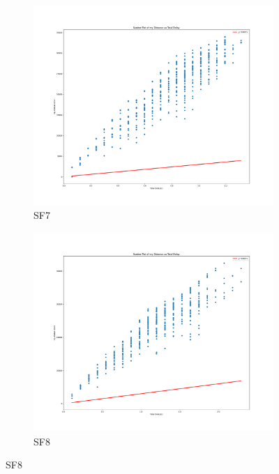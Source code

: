 \newpage

\begin{figure}[htp!]
    \centering
    \begin{subfigure}{0.45\linewidth}
        \includegraphics[width=\linewidth]{images/BlindZone1.png}
        \caption{SF7}
    \end{subfigure}
    \hfill
    \begin{subfigure}{0.45\linewidth}
        \includegraphics[width=\linewidth]{images/BlindZone2.png}
        \caption{SF8}
    \end{subfigure}

\end{figure}
